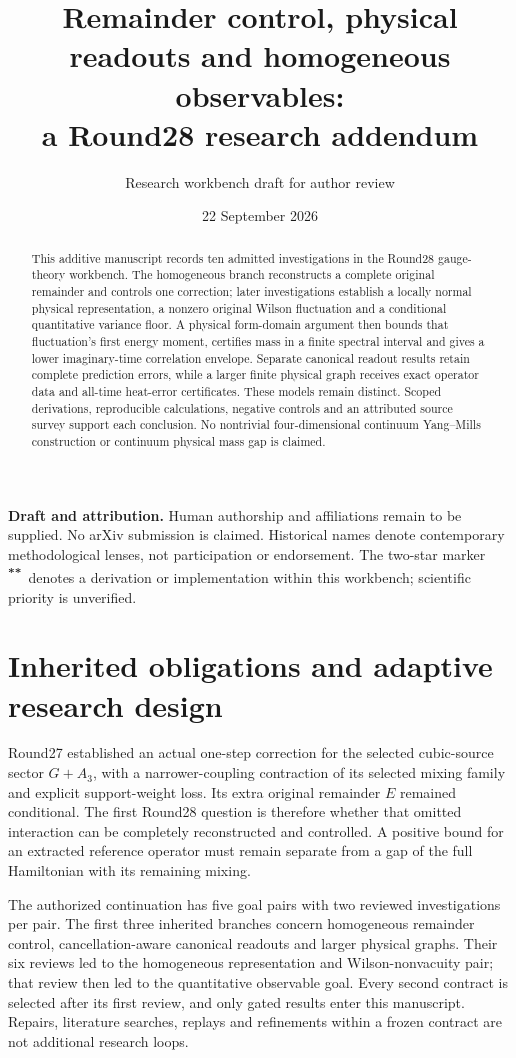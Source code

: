 \documentclass[11pt,a4paper]{article}
\title{Remainder control, physical readouts and homogeneous observables:\\a Round28 research addendum}
\author{Research workbench draft for author review}
\date{22 September 2026}
\newcommand{\workstar}{\textsuperscript{\textbf{**}}}
\begin{document}
\maketitle
\begin{abstract}
This additive manuscript records ten admitted investigations in the Round28 gauge-theory workbench. The homogeneous branch reconstructs a complete original remainder and controls one correction; later investigations establish a locally normal physical representation, a nonzero original Wilson fluctuation and a conditional quantitative variance floor. A physical form-domain argument then bounds that fluctuation's first energy moment, certifies mass in a finite spectral interval and gives a lower imaginary-time correlation envelope. Separate canonical readout results retain complete prediction errors, while a larger finite physical graph receives exact operator data and all-time heat-error certificates. These models remain distinct. Scoped derivations, reproducible calculations, negative controls and an attributed source survey support each conclusion. No nontrivial four-dimensional continuum Yang--Mills construction or continuum physical mass gap is claimed.
\end{abstract}
\begin{center}\small
\textbf{Draft and attribution.} Human authorship and affiliations remain to be supplied. No arXiv submission is claimed. Historical names denote contemporary methodological lenses, not participation or endorsement. The two-star marker \workstar\ denotes a derivation or implementation within this workbench; scientific priority is unverified.
\end{center}


\section{Inherited obligations and adaptive research design}
Round27 established an actual one-step correction for the selected cubic-source sector $G+A_3$, with a narrower-coupling contraction of its selected mixing family and explicit support-weight loss. Its extra original remainder $E$ remained conditional. The first Round28 question is therefore whether that omitted interaction can be completely reconstructed and controlled. A positive bound for an extracted reference operator must remain separate from a gap of the full Hamiltonian with its remaining mixing.

The authorized continuation has five goal pairs with two reviewed investigations per pair. The first three inherited branches concern homogeneous remainder control, cancellation-aware canonical readouts and larger physical graphs. Their six reviews led to the homogeneous representation and Wilson-nonvacuity pair; that review then led to the quantitative observable goal. Every second contract is selected after its first review, and only gated results enter this manuscript. Repairs, literature searches, replays and refinements within a frozen contract are not additional research loops.
\end{document}
